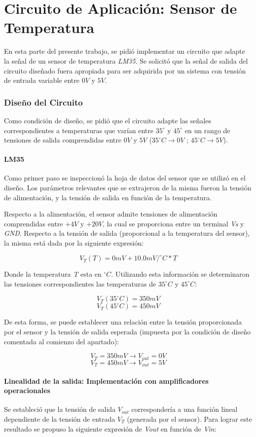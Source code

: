 \part{Circuito de Aplicación: Sensor de Temperatura}
En esta parte del presente trabajo, se pidió implementar un circuito que adapte la señal de un sensor de temperatura \emph{LM35}. Se solicitó que la señal de salida del circuito diseñado fuera apropiada para ser adquirida por un sistema con tensión de entrada variable entre $0V$ y $5V$.

\section{Diseño del Circuito}
Como condición de diseño, se pidió que el circuito adapte las señales correspondientes a temperaturas que varían entre $35^\circ$ y $45^\circ$ en un rango de tensiones de salida comprendidas entre $0V$ y $5V$ ($35^\circ C \rightarrow 0V$ ; $45^\circ C \rightarrow 5V$).

\subsection{LM35}
Como primer paso se inspeccionó la hoja de datos del sensor que se utilizó en el diseño. Los parámetros relevantes que se extrajeron de la misma fueron la tensión de alimentación, y la tensión de salida en función de la temperatura. 

Respecto a la alimentación, el sensor admite tensiones de alimentación comprendidas entre $+4V$ y $+20V$, la cual se proporciona entre un terminal \emph{Vs} y \emph{GND}. Respecto a la tensión de salida (proporcional a la temperatura del sensor), la misma está dada por la siguiente expresión:

\[V_{T}(T) = 0mV + 10.0mV / ^\circ C * T\]

Donde la temperatura \emph{T} esta en $^\circ C$. Utilizando esta información se determinaron las tensiones correspondientes las temperaturas de $35^\circ C$ y $45^\circ C$:

\[V_T(35^\circ C) = 350mV\]
\[V_T(45^\circ C) = 450mV\]

De esta forma, se puede establecer una relación entre la tensión proporcionada por el sensor y la tensión de salida esperada (impuesta por la condición de diseño comentada al comienzo del apartado):

\[V_T = 350mV \rightarrow V_{out} = 0V\]
\[V_T = 450mV \rightarrow V_{out} = 5V\]

\subsection{Linealidad de la salida: Implementación con amplificadores operacionales}\label{linealidad}
Se estableció que la tensión de salida $V_{out}$ correspondería a una función lineal dependiente de la tensión de entrada $V_T$ (generada por el sensor). Para lograr este resultado se propuso la siguiente expresión de \emph{Vout} en función de \emph{Vin}:

